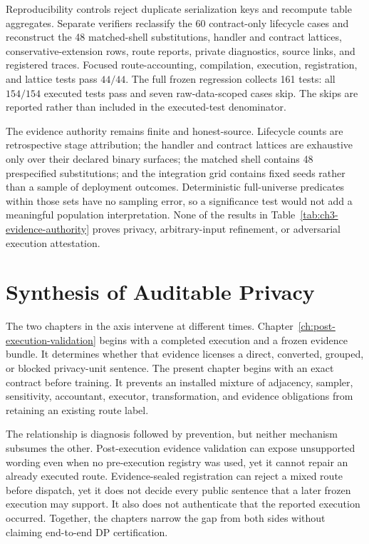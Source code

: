 Reproducibility controls reject duplicate serialization keys and recompute table
aggregates.  Separate verifiers reclassify the 60 contract-only lifecycle cases
and reconstruct the 48 matched-shell substitutions, handler and contract lattices,
conservative-extension rows, route reports, private diagnostics, source links, and
registered traces.  Focused route-accounting, compilation, execution,
registration, and lattice tests pass \(44/44\).  The full frozen regression
collects 161 tests: all \(154/154\) executed tests pass and seven raw-data-scoped
cases skip.  The skips are reported rather than included in the executed-test
denominator.

The evidence authority remains finite and honest-source.  Lifecycle counts are
retrospective stage attribution; the handler and contract lattices are exhaustive
only over their declared binary surfaces; the matched shell contains 48
prespecified substitutions; and the integration grid contains fixed seeds rather
than a sample of deployment outcomes.  Deterministic full-universe predicates
within those sets have no sampling error, so a significance test would not add a
meaningful population interpretation.  None of the results in
Table~\ref{tab:ch3-evidence-authority} proves privacy, arbitrary-input refinement,
or adversarial execution attestation.

\clearpage
\section{Synthesis of Auditable Privacy}
\label{sec:ch3-auditable-privacy-synthesis}

The two chapters in the \AuditablePrivacy{} axis intervene at different times.
Chapter~\ref{ch:post-execution-validation} begins with a completed execution and a
frozen evidence bundle.  It determines whether that evidence licenses a direct,
converted, grouped, or blocked privacy-unit sentence.  The present chapter begins
with an exact contract before training.  It prevents an installed mixture of
adjacency, sampler, sensitivity, accountant, executor, transformation, and
evidence obligations from retaining an existing route label.

The relationship is diagnosis followed by prevention, but neither mechanism
subsumes the other.  Post-execution evidence validation can expose unsupported
wording even when no pre-execution registry was used, yet it cannot repair an
already executed route.  Evidence-sealed registration can reject a mixed route
before dispatch, yet it does not decide every public sentence that a later frozen
execution may support.  It also does not authenticate that the reported execution
occurred.  Together, the chapters narrow the gap from both sides without claiming
end-to-end DP certification.


